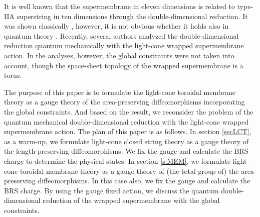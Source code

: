 \documentclass[12pt,a4paper]{article}
\begin{document}
It is well known that the supermembrane in eleven dimensions is
related to type-IIA superstring in ten dimensions through the
double-dimensional reduction.
It was shown classically \cite{DHIS}, however, it is not obvious whether
it holds also in quantum theory \cite{Rus,SY}.
Recently, several authors \cite{SY,UY} analyzed the double-dimensional
reduction quantum mechanically with the light-cone wrapped
supermembrane action.
In the analyses, however, the global constraints were not taken into
account, though the space-sheet topology of the wrapped supermembrane
is a torus.

The purpose of this paper is to formulate the light-cone toroidal
membrane theory as a gauge theory of the area-preserving
diffeomorphisms incorporating the global constraints.
And based on the result, we reconsider the problem of the quantum
mechanical double-dimensional reduction with the light-cone wrapped
supermembrane action.
The plan of this paper is as follows. In section \ref{secLCT},
as a warm-up, we formulate light-cone closed string theory as a gauge
theory of the length-preserving diffeomorphisms.
We fix the gauge and calculate the BRS charge to determine the
physical states.
In section \ref{s:MEM}, we formulate light-cone toroidal membrane
theory as a gauge theory of (the total group of) the area-preserving
diffeomorphisms. In this case also, we fix the gauge and calculate the
BRS charge. By using the gauge fixed action, we discuss the quantum
double-dimensional reduction of the wrapped supermembrane with the
global constraints.

\end{document}
